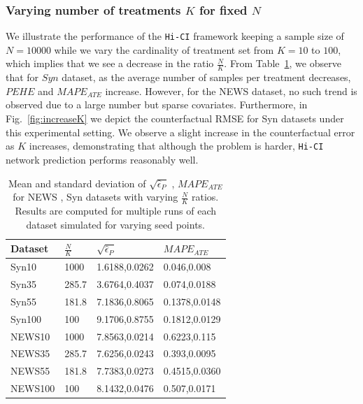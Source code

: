 \documentclass[twoside,11pt]{article}
\begin{document}
\subsubsection{Varying number of treatments $K$ for fixed $N$}
We illustrate the performance of the \texttt{Hi-CI} framework keeping a sample size of $N=10000$ while we vary the cardinality of treatment set from $K=10$ to $100$, which implies that we see a decrease in the ratio  $\frac{N}{K}$. From Table~\ref{tab:varying NbyK}, we observe that for $Syn$ dataset, as the average number of samples per treatment decreases, $PEHE$ and $MAPE_{ATE}$ increase. However, for the \textsf{NEWS} dataset, no such trend is observed due to a large number but sparse covariates. Furthermore, in Fig.~\ref{fig:increaseK} we depict the counterfactual RMSE for \textsf{Syn} datasets under this experimental setting. We observe a slight increase in the  counterfactual error as $K$ increases,  demonstrating that although the problem is harder, \texttt{Hi-CI} network prediction performs reasonably well.


\begin{table}[]
\centering
\caption{Mean and standard deviation of $\sqrt{\hat\epsilon_{P}}$ , $MAPE_{ATE}$ for \textsf{NEWS , Syn} datasets with varying $\frac{N}{K}$ ratios. Results are computed for multiple runs of each dataset simulated for varying seed points.}
    \label{tab:varying NbyK}
    \begin{tabular}{l|l|l|l}
        \hline
        Dataset & $\frac{N}{K}$ & $\sqrt{\hat\epsilon_{P}}$ & $MAPE_{ATE}$\\
        \hline
        \textsf{Syn10} & 1000 & 1.6188,0.0262 & 0.046,0.008\\
        \textsf{Syn35} & 285.7 & 3.6764,0.4037 & 0.074,0.0188\\
        \textsf{Syn55} & 181.8 & 7.1836,0.8065 & 0.1378,0.0148\\
        \textsf{Syn100} & 100 & 9.1706,0.8755 & 0.1812,0.0129\\
        \textsf{NEWS10} & 1000 & 7.8563,0.0214 & 0.6223,0.115\\
        \textsf{NEWS35} & 285.7 & 7.6256,0.0243 & 0.393,0.0095\\
        \textsf{NEWS55} & 181.8 & 7.7383,0.0273 & 0.4515,0.0360\\
        \textsf{NEWS100} & 100 & 8.1432,0.0476 & 0.507,0.0171\\
        \hline
    \end{tabular}
\end{table}
\end{document}
